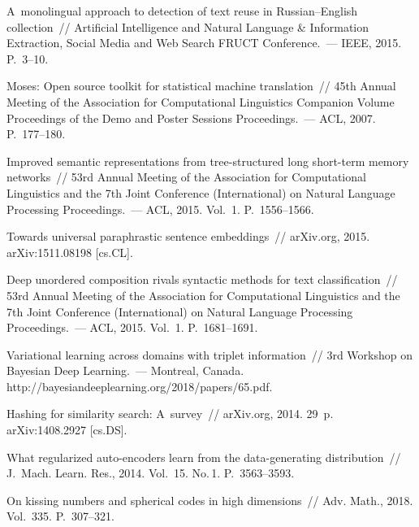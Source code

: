\begin{multicols}{2}
{{\begin{thebibliography}{99}
 A~monolingual 
approach to detection of text reuse in Russian--English collection~// Artificial 
Intelligence and Natural Language \& Information Extraction, Social Media and 
Web Search FRUCT Conference.~--- IEEE, 2015. P.~3--10.

 Moses: Open source toolkit for statistical machine 
translation~//  45th Annual Meeting of the Association for 
Computational Linguistics Companion Volume Proceedings of the Demo and Poster 
Sessions Proceedings.~--- ACL, 2007. P.~177--180.


  Improved semantic representations from 
tree-structured long short-term memory networks~// 53rd 
Annual Meeting of the Association for Computational Linguistics and the 7th 
 Joint Conference (International) on Natural Language Processing Proceedings.~--- ACL, 2015. 
Vol.~1. P.~1556--1566.


 Towards universal 
paraphrastic sentence embeddings~// arXiv.org, 2015. arXiv:1511.08198 [cs.CL].



 Deep unordered 
composition rivals syntactic methods for text classification~// 
53rd Annual Meeting of the Association for Computational Linguistics and the 
7th  Joint Conference (International) on Natural Language Processing Proceedings.~--- ACL, 
2015. Vol.~1. P.~1681--1691.

 Variational learning across 
domains with triplet information~// 3rd Workshop on Bayesian Deep Learning.~--- Montreal, Canada. 
{\sf http://bayesiandeeplearning.org/2018/papers/65.pdf}.


 Hashing for similarity search: 
A~survey~// arXiv.org, 2014. 29~p. \mbox{arXiv}:1408.2927 [cs.DS].


 What regularized auto-encoders learn from the data-generating 
distribution~// J.~Mach. Learn. Res., 2014. 
Vol.~15. No.\,1. P.~3563--3593.


 On kissing numbers and spherical codes 
in high dimensions~// Adv.  Math., 2018. Vol.~335. P.~307--321.



\end{thebibliography}}}
\end{multicols}
